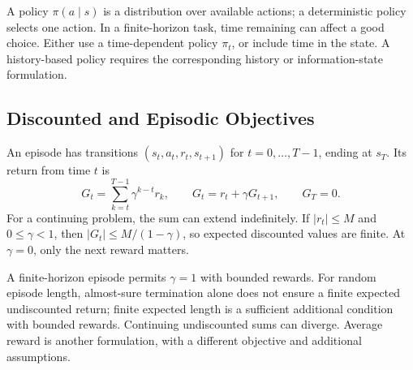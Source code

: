 A policy $\pi(a\mid s)$ is a distribution over available actions; a deterministic policy selects one action. In a finite-horizon task, time remaining can affect a good choice. Either use a time-dependent policy $\pi_t$, or include time in the state. A history-based policy requires the corresponding history or information-state formulation.

\par\addvspace{\intextsep}\noindent\begin{minipage}{\linewidth}
\centering
{}
\label{fig:rl-loop}
\end{minipage}\par\addvspace{\intextsep}

\subsection{Discounted and Episodic Objectives}

An episode has transitions $(s_t,a_t,r_t,s_{t+1})$ for $t=0,\ldots,T-1$, ending at $s_T$. Its return from time $t$ is
\[
G_t=\sum_{k=t}^{T-1}\gamma^{k-t}r_k,
\qquad G_t=r_t+\gamma G_{t+1},\qquad G_T=0.
\]
For a continuing problem, the sum can extend indefinitely. If $|r_t|\le M$ and $0\le\gamma<1$, then $|G_t|\le M/(1-\gamma)$, so expected discounted values are finite. At $\gamma=0$, only the next reward matters.

A finite-horizon episode permits $\gamma=1$ with bounded rewards. For random episode length, almost-sure termination alone does not ensure a finite expected undiscounted return; finite expected length is a sufficient additional condition with bounded rewards. Continuing undiscounted sums can diverge. Average reward is another formulation, with a different objective and additional assumptions.

